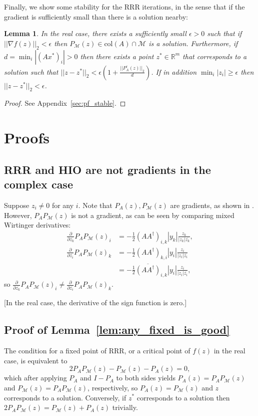 \documentclass[12pt]{article}
\newtheorem{lemma}{Lemma}
\theoremstyle{definition}
\theoremstyle{remark}
\theoremstyle{definition}
\theoremstyle{problem}
\theoremstyle{definition}
\newcommand{\blem}{\begin{lemma}}
\newcommand{\elem}{\end{lemma}}
\newcommand{\bpof}{\begin{proof}}
\newcommand{\epof}{\end{proof}}
\newcommand{\col}{\text{col}}
\newcommand{\RR}{\mathbb{R} }
\newcommand{\MM}{\mathcal{M}}
\begin{document}
Finally, we show some stability for the RRR iterations, in the sense that if the gradient is sufficiently small than there is a solution nearby:
\blem\label{lem:stable} In the real case, there exists a sufficiently small $\epsilon>0$ such that if $||\nabla f(z)||_2< \epsilon$ then $P_{\MM}(z)\in\col(A)\cap\MM$ is a solution. Furthermore, if $d=\min_i|(Ax^*)_i|>0$ then there exists a point $z^*\in\RR^m$ that corresponds to a solution such that $||z-z^*||_2<\epsilon\left(1 + \frac{||P_A^c(z)||_2}{d}\right)$. If in addition $\min_i|z_i|\geq\epsilon$ then $||z-z^*||_2< \epsilon$.\elem
\bpof See Appendix~\ref{sec:pf_stable}. \epof

\section{Proofs}

\subsection{RRR and HIO are not gradients in the complex case}\label{sec:complex_not_grads}

Suppose $z_i\neq 0$ for any $i$. Note that $P_A(z),P_{\MM}(z)$ are gradients, as shown in \cite{Marchesini2007}. However, $P_AP_{\MM}(z)$ is not a gradient, as can be seen by comparing mixed Wirtinger derivatives:
\[\begin{aligned} \frac{\partial}{\partial \overline{z_k}}P_AP_{\MM}(z)_i &= -\frac{1}{2}(AA^{\dagger})_{i,k}|y_k|\frac{z_k}{|z_k|\overline{z_k}},\\
\frac{\partial}{\partial \overline{z_i}}P_AP_{\MM}(z)_k &= -\frac{1}{2}(AA^{\dagger})_{k,i}|y_i|\frac{z_i}{|z_i|\overline{z_i}} \\&= -\frac{1}{2}\overline{(AA^{\dagger})}_{i,k}|y_i|\frac{z_i}{|z_i|\overline{z_i}},\end{aligned}\]
so $\frac{\partial}{\partial \overline{z_k}}P_AP_{\MM}(z)_i\neq \frac{\partial}{\partial \overline{z_i}}P_AP_{\MM}(z)_k$. 

[In the real case, the derivative of the sign function is zero.]

\subsection{Proof of Lemma~\ref{lem:any_fixed_is_good}}\label{sec:pf_any_fixed_good}

The condition for a fixed point of RRR, or a critical point of $f(z)$ in the real case, is equivalent to
\[ 2P_AP_{\MM}(z) - P_{\MM}(z) - P_A(z) = 0,\]
which after applying $P_A$ and $I-P_A$ to both sides yields $P_A(z) = P_AP_{\MM}(z)$ and $P_{\MM}(z) = P_AP_{\MM}(z)$, respectively, so $P_A(z)=P_{\MM}(z)$ and $z$ corresponds to a solution. Conversely, if $z^*$ corresponds to a solution then $2P_AP_{\MM}(z) = P_{\MM}(z) + P_A(z)$ trivially.
\end{document}

